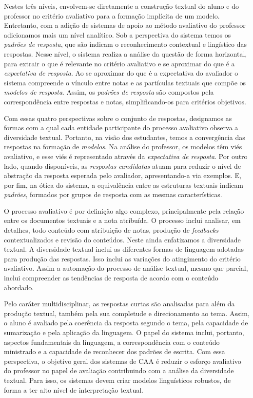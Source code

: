 Nestes três níveis, envolvem-se diretamente a construção textual do aluno e do professor no critério avaliativo para a formação implícita de um modelo. Entretanto, com a adição de sistemas de apoio ao método avaliativo do professor adicionamos mais um nível analítico. Sob a perspectiva do sistema temos os \textit{padrões de resposta}, que são indicam o reconhecimento contextual e lingístico das respostas. Nesse nível, o sistema realiza a análise da questão de forma horizontal, para extrair o que é relevante no critério avaliativo e se aproximar do que é a \textit{expectativa de resposta}. Ao se aproximar do que é a expectativa do avaliador o sistema compreende o vínculo entre notas e as partículas textuais que compõe os \textit{modelos de resposta}. Assim, os \textit{padrões de resposta} são compostos pela correspondência entre respostas e notas, simplificando-os para critérios objetivos.

Com essas quatro perspectivas sobre o conjunto de respostas, designamos as formas com a qual cada entidade participante do processo avaliativo observa a diversidade textual. Portanto, na visão dos estudantes, temos a convergência das respostas na formação de \textit{modelos}. Na análise do professor, os modelos têm viés avaliativo, e esse viés é representado através da \textit{expectativa de resposta}. Por outro lado, quando disponíveis, as \textit{respostas candidatas} atuam para reduzir o nível de abstração da resposta esperada pelo avaliador, apresentando-a via exemplos.  E, por fim, na ótica do sistema, a equivalência entre as estruturas textuais indicam \textit{padrões}, formados por grupos de resposta com as mesmas características.

O processo avaliativo é por definição algo complexo, principalmente pela relação entre os documentos textuais e a nota atribuída. O processo inclui analisar, em detalhes, todo conteúdo com atribuição de notas, produção de \textit{feedbacks} contextualizados e revisão do conteúdos. Neste ainda enfatizamos a diversidade textual. A diversidade textual inclui as diferentes formas de linguagem adotadas para produção das respostas. Isso inclui as variações do atingimento do critério avaliativo. Assim a automação do processo de análise textual, mesmo que parcial, inclui compreender as tendências de resposta de acordo com o conteúdo abordado. 

Pelo caráter multidisciplinar, as respostas curtas são analisadas para além da produção textual, também pela sua completude e direcionamento ao tema. Assim, o aluno é avaliado pela coerência da resposta segundo o tema, pela capacidade de sumarização e pela aplicação da linguagem. O papel do sistema inclui, portanto, aspectos fundamentais da linguagem, a correspondência com o conteúdo ministrado e a capacidade de reconhecer dos padrões de escrita. Com essa perspectiva, o objetivo geral dos sistemas de CAA é reduzir o esforço avaliativo do professor no papel de avaliação contribuindo com a análise da diversidade textual. Para isso, os sistemas devem criar modelos linguísticos robustos, de forma a ter alto nível de interpretação textual.

